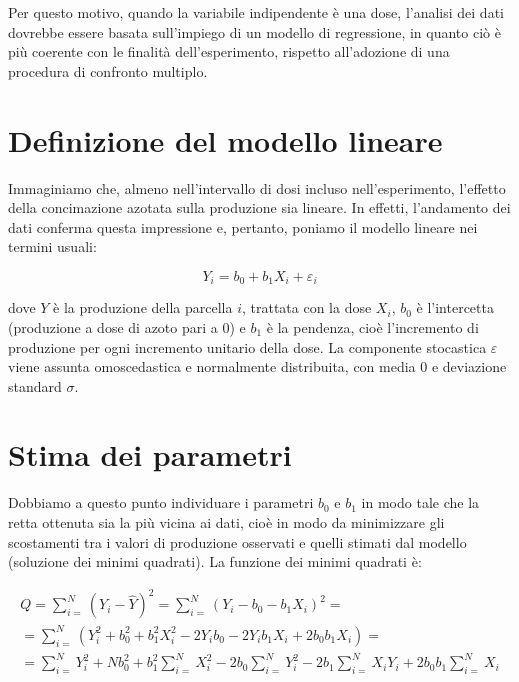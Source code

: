 \documentclass[a4paper,12pt,oneside]{book}
\begin{document}
Per questo motivo, quando la variabile indipendente è una dose, l'analisi dei dati dovrebbe essere basata sull'impiego di un modello di regressione, in quanto ciò è più coerente con le finalità dell'esperimento, rispetto all'adozione di una procedura di confronto multiplo.

\hypertarget{definizione-del-modello-lineare}{%
\section{Definizione del modello lineare}\label{definizione-del-modello-lineare}}

Immaginiamo che, almeno nell'intervallo di dosi incluso nell'esperimento, l'effetto della concimazione azotata sulla produzione sia lineare. In effetti, l'andamento dei dati conferma questa impressione e, pertanto, poniamo il modello lineare nei termini usuali:

\[Y_i = b_0 + b_1 X_i + \varepsilon_i\]

dove \(Y\) è la produzione della parcella \(i\), trattata con la dose \(X_i\), \(b_0\) è l'intercetta (produzione a dose di azoto pari a 0) e \(b_1\) è la pendenza, cioè l'incremento di produzione per ogni incremento unitario della dose. La componente stocastica \(\varepsilon\) viene assunta omoscedastica e normalmente distribuita, con media 0 e deviazione standard \(\sigma\).

\hypertarget{stima-dei-parametri-2}{%
\section{Stima dei parametri}\label{stima-dei-parametri-2}}

Dobbiamo a questo punto individuare i parametri \(b_0\) e \(b_1\) in modo tale che la retta ottenuta sia la più vicina ai dati, cioè in modo da minimizzare gli scostamenti tra i valori di produzione osservati e quelli stimati dal modello (soluzione dei minimi quadrati). La funzione dei minimi quadrati è:

\[\begin{array}{l}
Q = \sum\limits_{i = }^N {\left( {{Y_i} - \hat Y} \right)^2 = \sum\limits_{i = }^N {{{\left( {{Y_i} - {b_0} - {b_1}{X_i}} \right)}^2}}  = } \\
 = \sum\limits_{i = }^N {\left( {Y_i^2 + b_0^2 + b_1^2X_i^2 - 2{Y_i}{b_0} - 2{Y_i}{b_1}{X_i} + 2{b_0}{b_1}{X_i}} \right)}  = \\
 = \sum\limits_{i = }^N {Y_i^2 + Nb_0^2 + b_1^2\sum\limits_{i = }^N {X_i^2 - 2{b_0}\sum\limits_{i = }^N {Y_i^2 - 2{b_1}\sum\limits_{i = }^N {{X_i}{Y_i} + } } } } 2{b_0}{b_1}\sum\limits_{i = }^N {{X_i}} 
\end{array}\]
\end{document}

